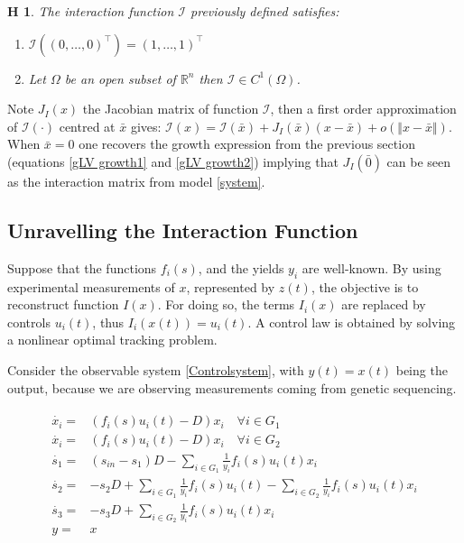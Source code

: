 \documentclass[3p,times]{article}
\newcommand{\R}{\mathbb{R}}
\newcommand{\I}{\mathcal{I}}
\newtheorem{hypo}{H}
\begin{document}
\begin{hypo}
	The interaction function $\I$ previously defined satisfies:
	\begin{enumerate}
		\item $	\I \left( (0,\dots,0)^\top \right) = (1,\dots,1)^\top $
		\item Let $\Omega$ be an open subset of $ \R^n $ then $\I \in C^1(\Omega)$.
	\end{enumerate} 
\end{hypo}


Note $J_I(x)$ the Jacobian matrix of function $\mathcal{I}$, then a first order approximation of $\I(\cdot)$ centred at $\bar{x}$ gives: $\I(x) = \I(\bar{x}) + J_I(\bar{x})(x-\bar{x}) + o(\Vert x- \bar{x} \Vert)$. When $\bar{x}= 0$ one recovers the growth expression from the previous section (equations \eqref{gLV growth1} and \eqref{gLV growth2}) implying that $J_I(\bar{0})$ can be seen as the interaction matrix from model \eqref{system}.

\subsection{Unravelling the Interaction Function}

Suppose that the functions $f_i(s)$, and the yields $y_i$ are well-known. By using experimental measurements of $x$, represented by $z(t)$, the objective is to reconstruct function $I(x)$. For doing so, the terms $I_i(x)$ are replaced by controls $u_i(t)$, thus $I_i(x(t)) = u_i(t)$. A control law is obtained by solving a nonlinear optimal tracking problem.	

Consider the observable system \eqref{Controlsystem}, with $y(t) = x(t)$ being the output, because we are observing measurements coming from genetic sequencing.

\begin{align} 
\label{Controlsystem}
\begin{array}{cl}
\dot{x_i} =& \left(f_i(s)u_i(t) -D \right)x_i \quad \forall i \in G_1\\
\dot{x_i} =& \left(f_i(s)u_i(t) -D \right)x_i \quad \forall i \in G_2\\
\dot{s_1} =& \displaystyle (s_{in}-s_1)D-\sum\limits_{i \in G_1}\frac{1}{y_i}f_i(s)u_i(t) x_i  \\
\dot{s_2} = & \displaystyle -s_2D+\sum\limits_{i \in G_1}\frac{1}{y_i}f_i(s)u_i(t)	-\sum\limits_{i \in G_2}\frac{1}{y_i}f_i(s)u_i(t) x_i  \\
\dot{s_3} =&  \displaystyle -s_3D+\sum\limits_{i \in G_2}\frac{1}{y_i}f_i(s)u_i(t) x_i \\
y  =& x
\end{array}
\end{align}	
\end{document}
